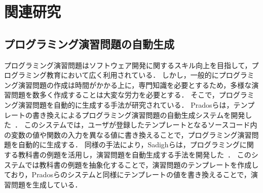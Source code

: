\chapter{関連研究}
\graphicspath{{Chapter2/Figs/}}

%
%
\section{プログラミング演習問題の自動生成}
プログラミング演習問題はソフトウェア開発に関するスキル向上を目指して，プログラミング教育において広く利用されている．
しかし，一般的にプログラミング演習問題の作成は時間がかかる上に，専門知識を必要とするため，多様な演習問題を数多く作成することは大変な労力を必要とする．
そこで，プログラミング演習問題を自動的に生成する手法が研究されている．
Pradosらは，テンプレートの書き換えによるプログラミング演習問題の自動生成システムを開発した~\cite{prados_automatic_exercise_generation}．
このシステムでは，ユーザが登録したテンプレートとなるソースコード内の変数の値や関数の入力を異なる値に書き換えることで，プログラミング演習問題を自動的に生成する．
同様の手法により，Sadighらは，プログラミングに関する教科書の例題を活用し，演習問題を自動生成する手法を開発した~\cite{Sadigh_automatic_exercise_generation}．
このシステムでは教科書の例題を抽象化することで，演習問題のテンプレートを作成しており，Pradosらのシステムと同様にテンプレートの値を書き換えることで，演習問題を生成している．
